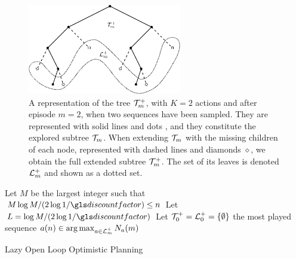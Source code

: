 \begin{figure}[ht]
	\centering
	\includegraphics[width=0.6\textwidth]{img/tree_svg-tex}
	\caption{A representation of the tree $\mathcal{T}_m^+$, with $K = 2$ actions and after episode $m = 2$, when two sequences have been sampled. They are represented with solid lines and dots \textbullet, and they constitute the explored subtree $\mathcal{T}_m$. When extending $\mathcal{T}_m$ with the missing children of each node, represented with dashed lines and diamonds $\diamond$, we obtain the full extended subtree $\mathcal{T}_m^+$. The set of its leaves is denoted $\mathcal{L}_m^+$ and shown as a dotted set.}
	\label{fig:tree}
\end{figure}

\begin{algorithm}[tp]
	\DontPrintSemicolon
	Let $M$ be the largest integer such that $M \log M/(2 \log 1/\discount) \leq n$\;
	Let $L = \log M / (2 \log 1/\discount)$\;
	Let $\mathcal{T}_0^+ = \mathcal{L}_0^+ = \{\emptyset\}$\;
	\Return the most played sequence $a(n) \in \operatorname*{arg\,max}_{a\in \mathcal{L}_m^+} N_a(m)$
	\caption{Lazy Open Loop Optimistic Planning}
	\label{alg:lazy-kl-olop}
\end{algorithm}


